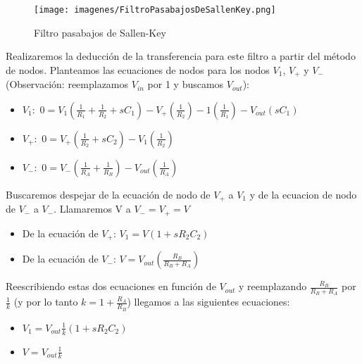 \documentclass[12pt, titlepage]{article}
\begin{document}
    \vspace{2mm}
    \begin{figure}[!htb]
    \texttt{[image: imagenes/FiltroPasabajosDeSallenKey.png]}
    \centering
    \caption{Filtro pasabajos de Sallen-Key}
    \end{figure}
    
    Realizaremos la deducción de la transferencia para este filtro a partir del método de nodos. Planteamos las ecuaciones de nodos para los nodos $V_{1}$, $V_{+}$ y $V_{-}$ (Observación: reemplazamos $V_{in}$ por 1 y buscamos $V_{out}$):
    \begin{itemize}
        \item $V_1:$ \hspace{5mm}$0 = V_1(\frac{1}{R_1}+\frac{1}{R_2}+sC_1)-V_{+}(\frac{1}{R_2})-1(\frac{1}{R_1})-V_{out}(sC_1)$
        \item $V_{+}:$ \hspace{5mm} $0 = V_{+}(\frac{1}{R_2}+sC_2) - V_1(\frac{1}{R_2})$
        \item $V_{-}:$ \hspace{5mm} $0 = V_{-}(\frac{1}{R_A}+\frac{1}{R_B})-V_{out}(\frac{1}{R_A})$
    \end{itemize}
        
    Buscaremos despejar de la ecuación de nodo de $V_{+}$ a $V_{1}$ y de la ecuacion de nodo de $V_{-}$ a $V_{-}$. Llamaremos V a $V_{-} = V_{+} = V$
    \begin{itemize}
        \item De la ecuación de $V_+$:\hspace{5mm} $V_1 = V(1+s R_2 C_2)$
        \item De la ecuación de $V_-$: \hspace{5mm} $V = V_{out}(\frac{R_B}{R_B + R_A}) $
    \end{itemize}
    Reescribiendo estas dos ecuaciones en función de $V_{out}$ y reemplazando $\frac{R_B}{R_B + R_A}$ por $\frac{1}{k}$ (y por lo tanto $k = 1+\frac{R_A}{R_B}$) llegamos a las siguientes ecuaciones:
    \begin{itemize}
        \item $V_1 = V_{out}\frac{1}{k}(1+sR_2C_2)$
        \item $V = V_{out}\frac{1}{k}$
    \end{itemize}
    
\end{document}
